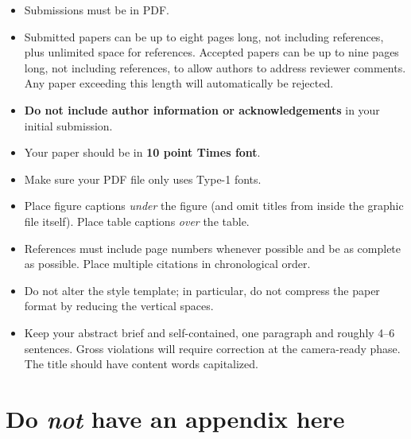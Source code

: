 \documentclass{article}
\begin{document}
\begin{itemize}
\item Submissions must be in PDF\@.
\item Submitted papers can be up to eight pages long, not including references, plus unlimited space for references. Accepted papers can be up to nine pages long, not including references, to allow authors to address reviewer comments. Any paper exceeding this length will automatically be rejected. 
\item \textbf{Do not include author information or acknowledgements} in your
    initial submission.
\item Your paper should be in \textbf{10 point Times font}.
\item Make sure your PDF file only uses Type-1 fonts.
\item Place figure captions \emph{under} the figure (and omit titles from inside
    the graphic file itself). Place table captions \emph{over} the table.
\item References must include page numbers whenever possible and be as complete
    as possible. Place multiple citations in chronological order.
\item Do not alter the style template; in particular, do not compress the paper
    format by reducing the vertical spaces.
\item Keep your abstract brief and self-contained, one paragraph and roughly
    4--6 sentences. Gross violations will require correction at the
    camera-ready phase. The title should have content words capitalized.
\end{itemize}









\appendix
\section{Do \emph{not} have an appendix here}
\end{document}
